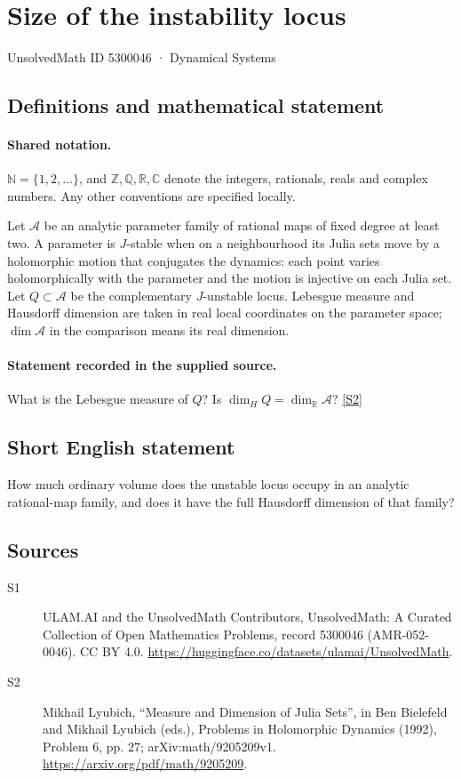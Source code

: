 \documentclass[11pt]{article}
\newcommand{\sref}[2]{\hyperlink{source:#1:#2}{[S#2]}}
\begin{document}
\setcounter{section}{5300045}
\section{Size of the instability locus}\label{5300046}
{\small\sffamily UnsolvedMath ID 5300046 · Dynamical Systems}
\subsection{Definitions and mathematical statement}

\paragraph{Shared notation.}$\mathbb N=\{1,2,\ldots\}$, and $\mathbb Z,\mathbb Q,\mathbb R,\mathbb C$ denote the integers, rationals, reals and complex numbers. Any other conventions are specified locally.


Let $\mathcal A$ be an analytic parameter family of rational maps of fixed degree at least two. A parameter is $J$-stable when on a neighbourhood its Julia sets move by a holomorphic motion that conjugates the dynamics: each point varies holomorphically with the parameter and the motion is injective on each Julia set. Let $Q\subset\mathcal A$ be the complementary $J$-unstable locus. Lebesgue measure and Hausdorff dimension are taken in real local coordinates on the parameter space; $\dim\mathcal A$ in the comparison means its real dimension.
\paragraph{Statement recorded in the supplied source.}
What is the Lebesgue measure of $Q$? Is $\dim_HQ=\dim_{\mathbb R}\mathcal A$? \sref{5300046}{2}
\subsection{Short English statement}
How much ordinary volume does the unstable locus occupy in an analytic rational-map family, and does it have the full Hausdorff dimension of that family?
\subsection{Sources}
\begin{description}
\item[\hypertarget{source:5300046:1}{S1}] ULAM.AI and the UnsolvedMath Contributors, UnsolvedMath: A Curated Collection of Open Mathematics Problems, record 5300046 (AMR-052-0046). CC BY 4.0. \url{https://huggingface.co/datasets/ulamai/UnsolvedMath}.
\item[\hypertarget{source:5300046:2}{S2}] Mikhail Lyubich, ``Measure and Dimension of Julia Sets'', in Ben Bielefeld and Mikhail Lyubich (eds.), Problems in Holomorphic Dynamics (1992), Problem 6, pp. 27; arXiv:math/9205209v1. \url{https://arxiv.org/pdf/math/9205209}.
\end{description}
\label{end:5300046}
\end{document}

